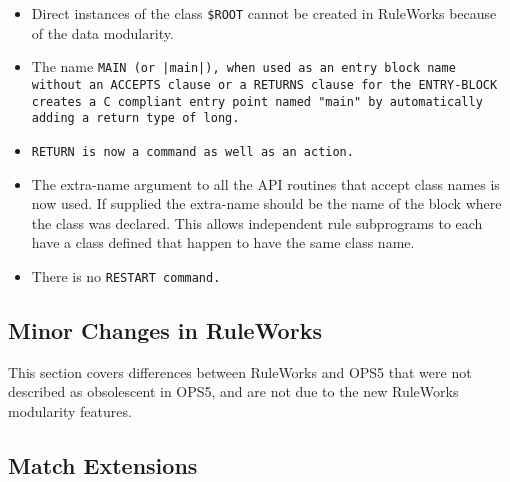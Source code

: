 \begin{itemize}
\item Direct instances of the class
  \verb|$ROOT| cannot be created in RuleWorks because of the data
  modularity.

\item The name \tt{MAIN} (or \verb,|main|,), when used as an entry
  block name without an \tt{ACCEPTS} clause or a \tt{RETURNS} clause
  for the \tt{ENTRY-BLOCK} creates a C compliant entry point named
  "main" by automatically adding a return type of long.

\item \tt{RETURN} is now a command as well as an action.

\item The extra-name argument to all the API routines that accept
  class names is now used. If supplied the extra-name should be the
  name of the block where the class was declared. This allows
  independent rule subprograms to each have a class defined that
  happen to have the same class name.

\item There is no \tt{RESTART} command.
\end{itemize}

\subsection{Minor Changes in RuleWorks}

This section covers differences between RuleWorks and OPS5 that were
not described as obsolescent in OPS5, and are not due to the new
RuleWorks modularity features.

\subsection{Match Extensions}

